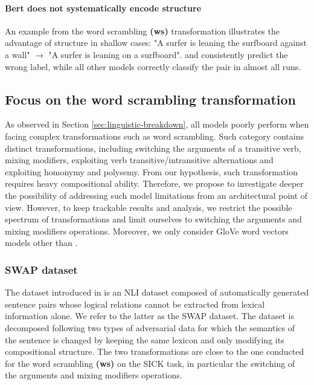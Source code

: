 \paragraph{Bert does not systematically encode structure}

An example from the word scrambling \textbf{(ws)} transformation illustrates the advantage of structure in shallow cases: "A surfer is leaning the surfboard against a wall" $\rightarrow$ "A surfer is leaning on a surfboard". \cls and \bow consistently predict the wrong label, while all other models correctly classify the pair in almost all runs. 




\FloatBarrier
\subsection{Focus on the word scrambling transformation}

As observed in Section \ref{sec:linguistic-breakdown}, all models poorly perform when facing complex transformations such as word scrambling. Such category contains distinct transformations, including switching the arguments of a transitive verb, mixing modifiers, exploiting verb transitive/intransitive alternations and exploiting homonymy and polysemy. From our hypothesis, such transformation requires heavy compositional ability. Therefore, we propose to investigate deeper the possibility of addressing such model limitations from an architectural point of view. However, to keep trackable results and analysis, we restrict the possible spectrum of transformations and limit ourselves to switching the arguments and mixing modifiers operations. Moreover, we only consider GloVe word vectors models other than \bert.

\subsubsection{SWAP dataset}

The dataset introduced in \textcite{nie_19b} is an NLI dataset composed of automatically generated sentence pairs whose logical relations cannot be extracted from lexical information alone. We refer to the latter as the SWAP dataset. The dataset is decomposed following two types of adversarial data for which the semantics of the sentence is changed by keeping the same lexicon and only modifying its compositional structure. The two transformations are close to the one conducted for the word scrambling \textbf{(ws)} on the SICK task, in particular the switching of the arguments and mixing modifiers operations.

